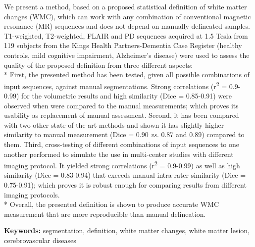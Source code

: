 We present a method, based on a proposed statistical definition of white matter changes (WMC), which can work with any combination of conventional magnetic resonance (MR) sequences and does not depend on manually delineated samples. T1-weighted, T2-weighted, FLAIR and PD sequences acquired at 1.5 Tesla from 119 subjects from the Kings Health Partners-Dementia Case Register (healthy controls, mild cognitive impairment, Alzheimer’s disease) were used to assess the quality of the proposed definition from three different aspects:
\\*
First, the presented method has been tested, given all possible combinations of input sequences, against manual segmentations. Strong correlations (r\textsuperscript{2} = 0.9-0.99) for the volumetric results and high similarity (Dice = 0.85-0.91) were observed when were compared to the manual measurements; which proves its usability as replacement of manual assessment.
Second, it has been compared with two other state-of-the-art methods and shown it has slightly higher similarity to manual measurement (Dice = 0.90 \textit{vs.} 0.87 and 0.89) compared to them.
Third, cross-testing of different combinations of input sequences to one another performed to simulate the use in multi-center studies with different imaging protocol. It yielded strong correlations (r\textsuperscript{2} = 0.9-0.99) as well as high similarity (Dice = 0.83-0.94) that exceeds manual intra-rater similarity (Dice = 0.75-0.91); which proves it is robust enough for comparing results from different imaging protocols.
\\*
Overall, the presented definition is shown to produce accurate WMC measurement that are more reproducible than manual delineation.

\textbf{Keywords:} segmentation, definition, white matter changes, white matter lesion, cerebrovascular diseases

  
  
  
  
  
  
  
  
  
  